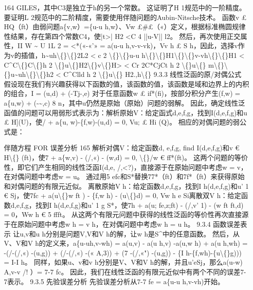 \documentclass[UTF8,11pt,a4paper,openany,fontset=fandol]{ctexbook}
\begin{document}
164 GILES，其中C3是独立于h的另一个常数。 这证明了H 1规范中的一阶精度。 要证明L 2规范中的二阶精度，需要使用伴随问题的Aubin-Nitsche技术。 函数v £ HQ（ft）由弱问题a\{v,w）=\{u-u h,w）、Vw £\#£（«）定义，根据标准椭圆规律性结果，存在第四个常数C4，使|t>| H2 <C 4 ||u-V|| l2。 然后，再次使用正交属性，II W \textasciitilde{} U 1L 2 = <*(«-«'» = a(u-u h,v-v-vk)，Vv h £ S h，因此，选择v作为v的插值，h\textasciitilde{}uh\textbackslash\{\}\textbackslash\{\}2L2 < c 2 \textbackslash\{\}\textbackslash\{\}u-u h\textbackslash\{\}\textbackslash\{\}H1\textbackslash\{\}\textbackslash\{\}v-vh\textbackslash\{\}\textbackslash\{\}H1 < C\textasciicircum{}C\textbackslash\{\}C\textbackslash\{\}h 2 \textbackslash\{\}u\textbackslash\{\}H2\textbackslash\{\}v\textbackslash\{\}H> < Cr 2C*CjCt h 2 \textbackslash\{\}u\textbackslash\{\} m\textbackslash\{\}\textbackslash\{\}u\textasciitilde{}uh\textbackslash\{\}\textbackslash\{\}h2 < C\textasciicircum{}Clld h 2 \textbackslash\{\}u\textbackslash\{\} H2.,h\textbackslash\{\} 9.3.3 线性泛函的原/对偶公式 假设现在我们有兴趣获得以下函数的值，该函数的值，该函数是域和边界上的内积的组合，I = (u,d) + (-Tj-,e) 对于任意函数w £ if*(fi)，按部分积分产生(f,w) = a\{u,w) + (-\textasciitilde{},c) 8 n，其中u仍然是原始（原始）问题的弱解。 因此，确定线性泛函值的问题可以用弱形式表示为：解析原始V：给定函式d,e,f,g，找到I(d,e,f,g)和u £ H](U)，使/ + a\{u, w)-\{f,w)-(u,d) = 0, Vu; £ Hi (Q)。 相应的对偶问题的弱公式是：

伴随方程 FOR 误差分析 165 解析对偶V：给定函数d, e,f,g, find I(d,e,f,g)和v € H\textbackslash\{\} (ft)，使7 + a\{w,v) - (/,«) - (w,d) = 0, \textbackslash\{\}/w € ff*(ft)。 这两个问题的等价性，即它们产生相同的线性泛函I(d,e, /,<?)，直接源于在原始问题中考虑w = v，在对偶问题中考虑w = u。 通过用5 efc和S*替换77*（ft）和7f*（ft）来获得原始和对偶问题的有限元近似。 离散原始V h：给定函数d,e,f,g，找到I h(d,e,f,g)和u' 1 € Sj，使7fc + a(u\textbackslash\{\}w ft ) - \{f,w h) - (u\textbackslash\{\}d) = 0, Vw h e Si离散双V h：给定函数d,e,f,g，找到I h(d,e,f,g)和u' 1 g S*，使7h + a(u; fe,z;ft) - (/,v' 1) - (w ft ft,d) = 0，Ww h € 5 ffft。 从这两个有限元问题中获得的线性泛函的等价性再次直接源于在原始问题中考虑w h = v h，在对偶问题中考虑w h = u h。 9.3.4 函数误差表示 让u,v和u h分别是问题V,V和V h的解，让w h是S\textasciicircum{}中的任意函数。 然后，从V、V和V h的定义来，a\{u-uh,v-wh) = a(u,v) - a(u h,v) -a(u,w h) + a(u h,wh) = -(/-(/,«) -(u,g)) + (/-(/,«) -(« A,3)) + (7 -(/,«") -(u,g)) - \{I h-\{f,wh)-\{u\textbackslash\{\}g))) = I-I h。 同样，如果u、v和v h分别是V、V和V h的解，并且u'eSj，那么a(u-w) A,v-v /! ）= 7-7 fc。 因此，我们在线性泛函的有限元近似中有两个不同的误差7-7表示。 9.3.5 先验误差分析 先验误差分析从7-7 fe = a\{u-u h,v-vh)开始。
\end{document}

